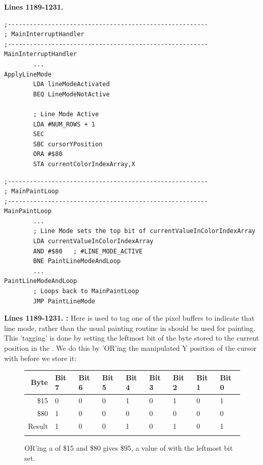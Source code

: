 \textbf{Lines 1189-1231. } 
\begin{lstlisting}[caption=From \icode{MainInterruptHandler}.]
;-------------------------------------------------------
; MainInterruptHandler
;-------------------------------------------------------
MainInterruptHandler
        ...
ApplyLineMode
        LDA lineModeActivated
        BEQ LineModeNotActive

        ; Line Mode Active
        LDA #NUM_ROWS + 1
        SEC 
        SBC cursorYPosition
        ORA #$80
        STA currentColorIndexArray,X
\end{lstlisting}

\begin{lstlisting}[caption=From \icode{MainPaintLoop}.]
;-------------------------------------------------------
; MainPaintLoop
;-------------------------------------------------------
MainPaintLoop    
        ...
        ; Line Mode sets the top bit of currentValueInColorIndexArray
        LDA currentValueInColorIndexArray
        AND #$80   ; #LINE_MODE_ACTIVE
        BNE PaintLineModeAndLoop
        ...
PaintLineModeAndLoop
        ; Loops back to MainPaintLoop
        JMP PaintLineMode
\end{lstlisting}
\clearpage
\textbf{Lines 1189-1231. :} Here  is used
to tag one of the pixel buffers to indicate that line mode, rather than the usual painting routine
in  should be used for painting. This 'tagging'
is done by setting the leftmost bit of the byte stored to the current position in the 
. We do this by 'OR'ing the manipulated Y position of the cursor
with  before we store it:

\begin{figure}[H]
  {
    \setlength{\tabcolsep}{3.0pt}
    \setlength\cmidrulewidth{\heavyrulewidth} %
    \begin{adjustbox}{width=7cm,center}

      \begin{tabular}{rllllllll}
        \toprule
        Byte & Bit 7 & Bit 6 & Bit 5 & Bit 4 & Bit 3 & Bit 2 & Bit 1 & Bit 0        \\
        \midrule
        \$15 & 0 & 0 & 0 & 1 & 0 & 1 & 0 & 1 \\
        \$80 & 1 & 0 & 0 & 0 & 0 & 0 & 0 & 0 \\
        \midrule
      Result & 1 & 0 & 0 & 1 & 0 & 1 & 0 & 1 \\
        \addlinespace
        \bottomrule
      \end{tabular}

    \end{adjustbox}

  }\caption*{OR'ing a  of \$15 and \$80 gives \$95, a value of  with the leftmost bit set.}
\end{figure}

